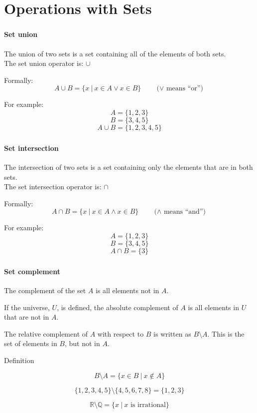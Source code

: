 \documentclass[mathserif]{beamer}
\newenvironment{compactmath}[1][\normalsize]%
	{\begin{minipage}{\textwidth}\vspace{-0.75\baselineskip}#1\begin{equation*}}
	{\end{equation*}\end{minipage}}
\begin{document}
	\section{Operations with Sets}
	\begin{frame}
		\frametitle{\secname}
		\framesubtitle{Set union}
		The union of two sets is a set containing all of the elements of both sets.
		\\
		The set union operator is: $\cup$

		Formally:
		\[A \cup B = \{x\ |\ x \in A \vee x \in B\} \qquad \text{($\vee$ means ``or'')}\]

		For example:
		\[A = \{1, 2, 3\}\]
		\[B = \{3, 4, 5\}\]
		\[A \cup B = \{1, 2, 3, 4, 5\}\]
	\end{frame}
	\begin{frame}
		\frametitle{\secname}
		\framesubtitle{Set intersection}
		The intersection of two sets is a set containing only the elements that are in both sets.
		\\
		The set intersection operator is: $\cap$

		Formally:
		\[A \cap B = \{x\ |\ x \in A \wedge x \in B\} \qquad \text{($\wedge$ means ``and'')}\]

		For example:
		\[A = \{1, 2, 3\}\]
		\[B = \{3, 4, 5\}\]
		\[A \cap B = \{3\}\]
	\end{frame}
	\begin{frame}
		\frametitle{\secname}
		\framesubtitle{Set complement}
		The \alert{complement} of the set $A$ is all elements not in $A$.

		If the universe, $U$, is defined, the \alert{absolute complement} of $A$ is all elements in $U$ that are not in $A$.
		
		The \alert{relative complement} of $A$ with respect to $B$ is written as $B \setminus A$. This is the set of elements in $B$, but not in $A$.
		\begin{block}{Definition}
			\begin{compactmath}[\large]
				B \setminus A = \{x \in B\ |\ x \notin A\}
			\end{compactmath}
		\end{block}
		\begin{examples}
			\begin{compactmath}
				\{1, 2, 3, 4, 5\} \setminus \{4, 5, 6, 7, 8\} = \{1, 2, 3\}
			\end{compactmath}
			\begin{compactmath}
				\mathbb{R} \setminus \mathbb{Q} = \{x\ |\ x \text{ is irrational}\}
			\end{compactmath}
		\end{examples}
	\end{frame}
\end{document}
